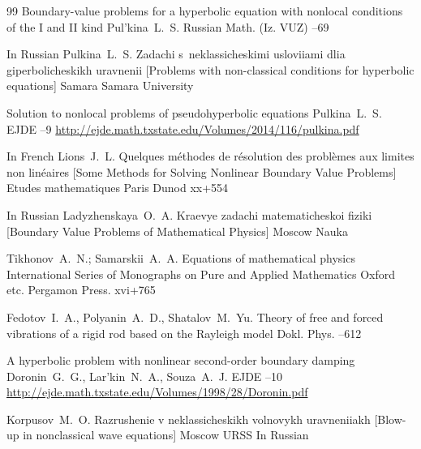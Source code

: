 \begin{thebibliography}{99}
\paper Boundary-value problems for a hyperbolic equation with nonlocal conditions of the I and II kind
\by Pul'kina~L.~S.
\jour Russian Math. (Iz. VUZ)
--69


\lang In Russian
\by Pulkina~L.~S.
\book Zadachi s~neklassicheskimi usloviiami dlia giperbolicheskikh uravnenii \rm [Problems with non-classical conditions for hyperbolic equations]
\publaddr Samara
\publ Samara University

\paper Solution to nonlocal problems of pseudohyperbolic  equations
\by    Pulkina~L.~S.
\jour  EJDE
--9
\elink \url{http://ejde.math.txstate.edu/Volumes/2014/116/pulkina.pdf}



\lang In French
\by Lions~J.~L.
\book Quelques m\'ethodes de r\'esolution des probl\`emes aux limites non lin\'eaires \rm [Some Methods for Solving Nonlinear Boundary Value Problems]
\serial Etudes mathematiques
\publaddr Paris
\publ Dunod 
\totalpages xx+554 

\lang In Russian
\by Ladyzhenskaya~O.~A.
\book Kraevye zadachi matematicheskoi fiziki \rm [Boundary Value Problems of Mathematical Physics]
\publaddr Moscow
\publ Nauka

\by Tikhonov~A.~N.; Samarskii~A.~A.
\book Equations of mathematical physics
\serial International Series of Monographs on Pure and Applied Mathematics
\publaddr Oxford etc.
\publ Pergamon Press.
\totalpages xvi+765 



\by Fedotov~I.~A., Polyanin~A.~D., Shatalov~M.~Yu.
\paper Theory of free and forced vibrations of a rigid rod based on the Rayleigh model
\jour Dokl. Phys.
--612 


\paper  A hyperbolic problem with nonlinear second-order boundary damping
\by   Doronin~G.~G., Lar'kin~N.~A., Souza~A.~J.
\jour  EJDE
--10
\elink \url{http://ejde.math.txstate.edu/Volumes/1998/28/Doronin.pdf}

\by Korpusov~M.~O.
\book Razrushenie v neklassicheskikh volnovykh uravneniiakh \rm [Blow-up in nonclassical wave equations]
\publaddr Moscow
\publ URSS
\lang In Russian


\end{thebibliography}

\EngDate

\renewcommand{\baselinestretch}{0.9}

\newpage
\Russian


%
